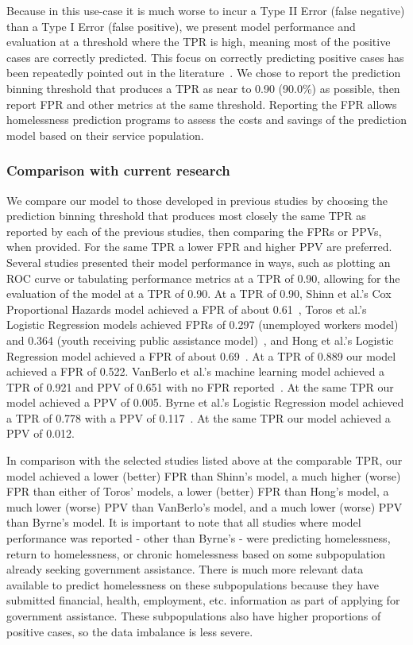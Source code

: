 \documentclass[10pt,letterpaper]{article}
\begin{document}
Because in this use-case it is much worse to incur a Type II Error (false negative) than a Type I Error (false positive), we present model performance and evaluation at a threshold where the TPR is high, meaning most of the positive cases are correctly predicted. This focus on correctly predicting positive cases has been repeatedly pointed out in the literature~\cite{vanberlo2021interpretable,hong2018applications}. We chose to report the prediction binning threshold that produces a TPR as near to 0.90 (90.0\%) as possible, then report FPR and other metrics at the same threshold. Reporting the FPR allows homelessness prediction programs to assess the costs and savings of the prediction model based on their service population.

\subsubsection*{Comparison with current research}
We compare our model to those developed in previous studies by choosing the prediction binning threshold that produces most closely the same TPR as reported by each of the previous studies, then comparing the FPRs or PPVs, when provided. For the same TPR a lower FPR and higher PPV are preferred. Several studies presented their model performance in ways, such as plotting an ROC curve or tabulating performance metrics at a TPR of 0.90, allowing for the evaluation of the model at a TPR of 0.90. At a TPR of 0.90, Shinn et al.'s Cox Proportional Hazards model achieved a FPR of about 0.61~\cite{shinn2013efficient}, Toros et al.'s Logistic Regression models achieved FPRs of 0.297 (unemployed workers model) and 0.364 (youth receiving public assistance model)~\cite{toros2019early}, and Hong et al.'s Logistic Regression model achieved a FPR of about 0.69~\cite{hong2018applications}. At a TPR of 0.889 our model achieved a FPR of 0.522. VanBerlo et al.'s machine learning model achieved a TPR of 0.921 and PPV of 0.651 with no FPR reported~\cite{vanberlo2021interpretable}. At the same TPR our model achieved a PPV of 0.005. Byrne et al.'s Logistic Regression model achieved a TPR of 0.778 with a PPV of 0.117~\cite{byrne2020classification}. At the same TPR our model achieved a PPV of 0.012.

In comparison with the selected studies listed above at the comparable TPR, our model achieved a lower (better) FPR than Shinn's model, a much higher (worse) FPR than either of Toros' models, a lower (better) FPR than Hong's model, a much lower (worse) PPV than VanBerlo's model, and a much lower (worse) PPV than Byrne's model. It is important to note that all studies where model performance was reported - other than Byrne's - were predicting homelessness, return to homelessness, or chronic homelessness based on some subpopulation already seeking government assistance. There is much more relevant data available to predict homelessness on these subpopulations because they have submitted financial, health, employment, etc. information as part of applying for government assistance. These subpopulations also have higher proportions of positive cases, so the data imbalance is less severe.
\end{document}
